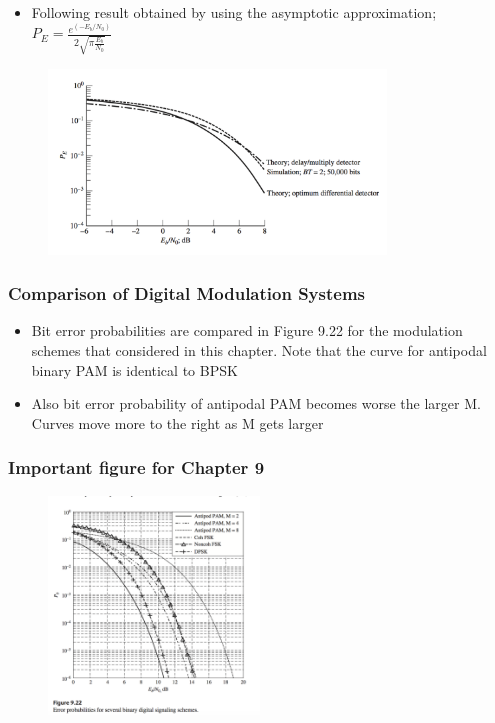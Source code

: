 \documentclass{beamer}
\begin{document}
\begin{frame}
	\begin{itemize}
	\item Following result obtained by using the asymptotic approximation;
	$P_E=\frac{e^(-E_b/N_0)}{2 \sqrt{\pi \frac {E_b}{N_0}}}$
	\end{itemize}
\begin{figure}
	\includegraphics[width=0.8\textwidth]{9_5.png}
\end{figure}
\end{frame}
\begin{frame}
	\frametitle{Comparison of Digital Modulation Systems}
	\begin{itemize}
		\item Bit error probabilities are compared in Figure 9.22 for the modulation schemes that considered in this chapter. Note that the curve for antipodal binary PAM is identical to BPSK
		\item  Also bit error probability of antipodal PAM  becomes worse the larger M. Curves move more to the right as M gets larger
	\end{itemize}
\end{frame}

	\begin{frame}
	\frametitle{Important figure for Chapter 9}
	\begin{figure}
\includegraphics[width=0.5\textwidth]{9_5_1.png}
	\end{figure}
\end{frame}
\end{document}
